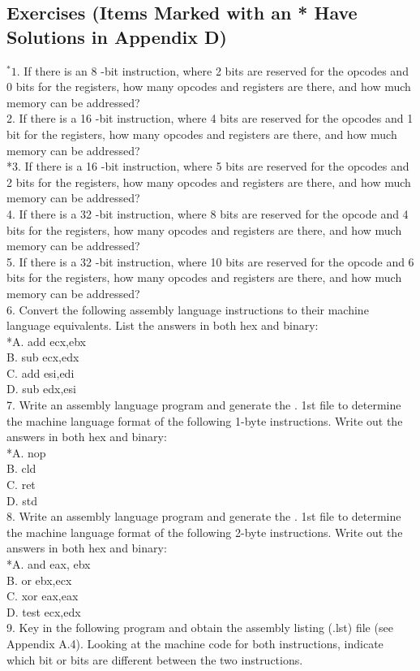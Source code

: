 \documentclass[10pt]{book}
\begin{document}
\subsection{Exercises (Items Marked with an * Have Solutions in Appendix D)}
${ }^{*} 1$. If there is an 8 -bit instruction, where 2 bits are reserved for the opcodes and 0 bits for the registers, how many opcodes and registers are there, and how much memory can be addressed?\\
2. If there is a 16 -bit instruction, where 4 bits are reserved for the opcodes and 1 bit for the registers, how many opcodes and registers are there, and how much memory can be addressed?\\
*3. If there is a 16 -bit instruction, where 5 bits are reserved for the opcodes and 2 bits for the registers, how many opcodes and registers are there, and how much memory can be addressed?\\
4. If there is a 32 -bit instruction, where 8 bits are reserved for the opcode and 4 bits for the registers, how many opcodes and registers are there, and how much memory can be addressed?\\
5. If there is a 32 -bit instruction, where 10 bits are reserved for the opcode and 6 bits for the registers, how many opcodes and registers are there, and how much memory can be addressed?\\
6. Convert the following assembly language instructions to their machine language equivalents. List the answers in both hex and binary:\\
*A. add ecx,ebx\\
B. sub ecx,edx\\
C. add esi,edi\\
D. sub edx,esi\\
7. Write an assembly language program and generate the . 1st file to determine the machine language format of the following 1-byte instructions. Write out the answers in both hex and binary:\\
*A. nop\\
B. cld\\
C. ret\\
D. std\\
8. Write an assembly language program and generate the . 1st file to determine the machine language format of the following 2-byte instructions. Write out the answers in both hex and binary:\\
*A. and eax, ebx\\
B. or ebx,ecx\\
C. xor eax,eax\\
D. test ecx,edx\\
9. Key in the following program and obtain the assembly listing (.lst) file (see Appendix A.4). Looking at the machine code for both instructions, indicate which bit or bits are different between the two instructions.
\end{document}
